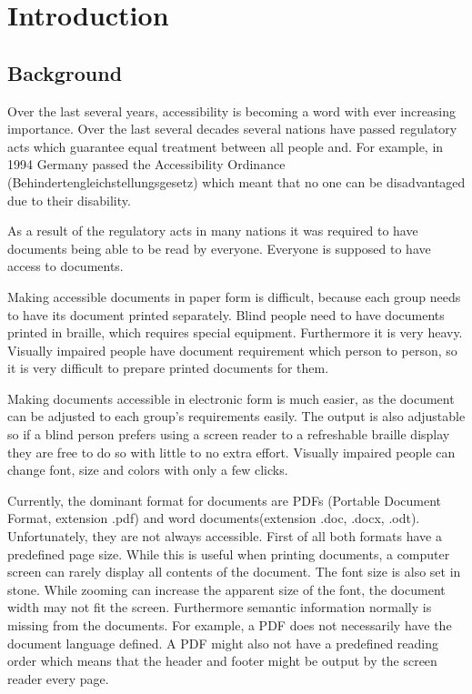 
\chapter{Introduction}
\label{ch:Introduction}

\section{Background}

Over the last several years, accessibility is becoming a word with ever increasing importance. Over the last several decades several nations have passed regulatory acts which guarantee equal treatment between all people and. For example, in 1994 Germany passed the Accessibility Ordinance (Behindertengleichstellungsgesetz) which meant that no one can be disadvantaged due to their disability.

As a result of the regulatory acts in many nations it was required to have documents being able to be read by everyone. Everyone is supposed to have access to documents.

Making accessible documents in paper form is difficult, because each group needs to have its document printed separately. Blind people need to have documents printed in braille, which requires special equipment. Furthermore it is very heavy. Visually impaired people have document requirement which person to person, so it is very difficult to prepare printed documents for them.

Making documents accessible in electronic form is much easier, as the document can be adjusted to each group's requirements easily. The output is also adjustable so if a blind person prefers using a screen reader to a refreshable braille display they are free to do so with little to no extra effort. Visually impaired people can change font, size and colors with only a few clicks.

Currently, the dominant format for documents are PDFs (Portable Document Format, extension .pdf) and word documents(extension .doc, .docx, .odt). Unfortunately, they are not always accessible. First of all both formats have a predefined page size. While this is useful when printing documents, a computer screen can rarely display all contents of the document. The font size is also set in stone. While zooming can increase the apparent size of the font, the document width may not fit the screen. Furthermore semantic information normally is missing from the documents. For example, a PDF does not necessarily have the document language defined. A PDF might also not have a predefined reading order which means that the header and footer might be output by the screen reader every page. 

